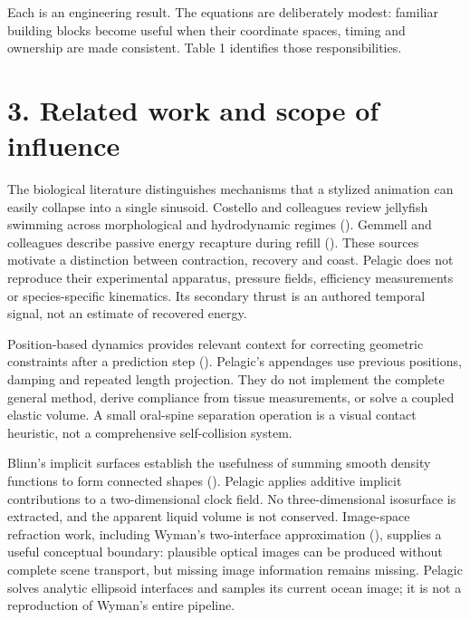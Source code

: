 \documentclass[
  english,
  11pt,
]{article}
\begin{document}
Each is an engineering result. The equations are deliberately modest:
familiar building blocks become useful when their coordinate spaces,
timing and ownership are made consistent. Table 1 identifies those
responsibilities.

\section{3. Related work and scope of
influence}\label{related-work-and-scope-of-influence}

The biological literature distinguishes mechanisms that a stylized
animation can easily collapse into a single sinusoid. Costello and
colleagues review jellyfish swimming across morphological and
hydrodynamic regimes (). Gemmell and colleagues describe passive energy recapture during
refill (). These sources
motivate a distinction between contraction, recovery and coast. Pelagic
does not reproduce their experimental apparatus, pressure fields,
efficiency measurements or species-specific kinematics. Its secondary
thrust is an authored temporal signal, not an estimate of recovered
energy.

Position-based dynamics provides relevant context for correcting
geometric constraints after a prediction step
(). Pelagic's appendages
use previous positions, damping and repeated length projection. They do
not implement the complete general method, derive compliance from tissue
measurements, or solve a coupled elastic volume. A small oral-spine
separation operation is a visual contact heuristic, not a comprehensive
self-collision system.

Blinn's implicit surfaces establish the usefulness of summing smooth
density functions to form connected shapes
(). Pelagic applies additive
implicit contributions to a two-dimensional clock field. No
three-dimensional isosurface is extracted, and the apparent liquid
volume is not conserved. Image-space refraction work, including Wyman's
two-interface approximation (),
supplies a useful conceptual boundary: plausible optical images can be
produced without complete scene transport, but missing image information
remains missing. Pelagic solves analytic ellipsoid interfaces and
samples its current ocean image; it is not a reproduction of Wyman's
entire pipeline.
\end{document}
